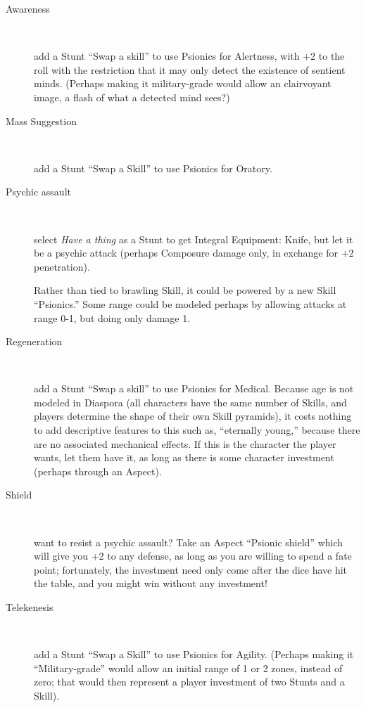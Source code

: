\begin{description}
\item[Awareness] ~

add a Stunt ``Swap a skill'' to use Psionics for Alertness, with +2 to the roll with the restriction that it may only detect the existence of sentient minds. (Perhaps making it military-grade would allow an clairvoyant image, a flash of what a detected mind sees?)

\item[Mass Suggestion] ~

add a Stunt ``Swap a Skill'' to use Psionics for Oratory.

\item[Psychic assault] ~

select \emph{Have a thing} as a Stunt to get Integral Equipment: Knife, but let it be a psychic attack (perhaps Composure damage only, in exchange for +2 penetration).

Rather than tied to brawling Skill, it could be powered by a new Skill ``Psionics.'' Some range could be modeled perhaps by allowing attacks at range 0-1, but doing only damage 1.

\item[Regeneration] ~

add a Stunt ``Swap a skill'' to use Psionics for Medical.  Because age is not modeled in Diaspora (all characters have the same number of Skills, and players determine the shape of their own Skill pyramids), it costs nothing to add descriptive features to this such as, ``eternally young,'' because there are no associated mechanical effects. If this is the character the player wants, let them have it, as long as there is some character investment (perhaps through an Aspect).

\item[Shield] ~

want to resist a psychic assault? Take an Aspect ``Psionic shield'' which will give you +2 to any defense, as long as you are willing to spend a fate point; fortunately, the investment need only come after the dice have hit the table, and you might win without any investment!

\item[Telekenesis] ~

add a Stunt ``Swap a Skill'' to use Psionics for Agility.  (Perhaps making it ``Military-grade'' would allow an initial range of 1 or 2 zones, instead of zero; that would then represent a player investment of two Stunts and a Skill).


\end{description}
